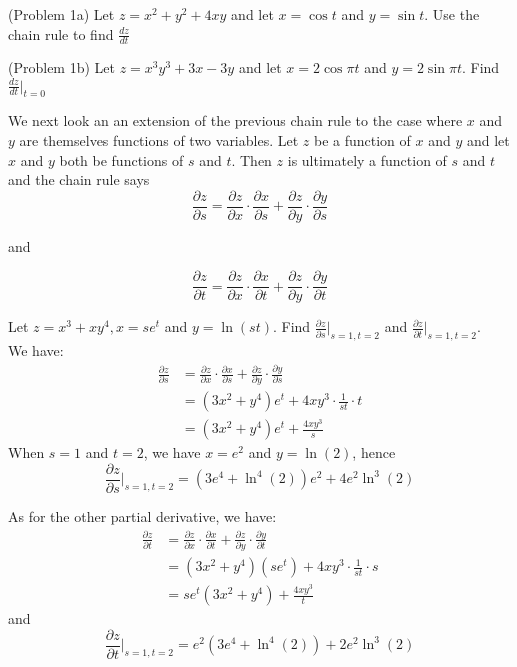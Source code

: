 \documentclass[handout]{ximera}
\begin{document}
\begin{problem}(Problem 1a)
Let $z = x^2 + y^2 + 4xy$ and let $x = \cos t$ and $y = \sin t$. Use the chain rule to find $\frac{dz}{dt}$
\end{problem}


\begin{problem}(Problem 1b)
Let $z = x^3 y^3 + 3x - 3y$ and let $x = 2\cos \pi t$ and $y = 2\sin \pi t$. Find $\frac{dz}{dt}\bigg|_{t = 0}$
\end{problem}





We next look an an extension of the previous chain rule to the case  where $x$ and $y$ are themselves functions of two variables.
Let $z$ be a function of $x$ and $y$ and let $x$ and $y$ both be functions of $s$ and $t$.  Then $z$ is ultimately a function of $s$ and $t$ and the chain rule says
\[
\frac{\partial z}{\partial s} = \frac{\partial z}{\partial x} \cdot \frac{\partial x}{\partial s} + \frac{\partial z}{\partial y} \cdot \frac{\partial y}{\partial s}
\]
\begin{center} 
and 
\end{center}
\[
\frac{\partial z}{\partial t} = \frac{\partial z}{\partial x} \cdot \frac{\partial x}{\partial t} + \frac{\partial z}{\partial y} \cdot \frac{\partial y}{\partial t} 
\]

\begin{example}[Example 2]
Let $z = x^3 + xy^4, x = se^t$ and $y = \ln(st)$. Find $\frac{\partial z}{\partial s}\bigg|_{s = 1, t = 2}$ and $\frac{\partial z}{\partial t}\bigg|_{s = 1, t = 2}$.\\



We have:
\begin{align*}
\frac{\partial z}{\partial s} &= \frac{\partial z}{\partial x} \cdot \frac{\partial x}{\partial s} + \frac{\partial z}{\partial y} \cdot \frac{\partial y}{\partial s}\\
                              &= (3x^2 + y^4)e^t + 4xy^3\cdot\frac{1}{st} \cdot t\\
                              &= (3x^2 + y^4)e^t + \frac{4xy^3}{s}
\end{align*}
When $s = 1$ and $t = 2$, we have $x = e^2$ and $y = \ln(2)$, hence
\[
\frac{\partial z}{\partial s}\bigg|_{s = 1, t = 2} = (3e^4 + \ln^4(2))e^2 + 4e^2 \ln^3(2)
\]

As for the other partial derivative, we have:
\begin{align*}
\frac{\partial z}{\partial t} &= \frac{\partial z}{\partial x} \cdot \frac{\partial x}{\partial t} + \frac{\partial z}{\partial y} \cdot \frac{\partial y}{\partial t}\\
                              &= (3x^2 + y^4)(se^t) + 4xy^3\cdot\frac{1}{st} \cdot s\\
                              &= se^t(3x^2 + y^4) + \frac{4xy^3}{t}
\end{align*}
and
\[
\frac{\partial z}{\partial t}\bigg|_{s = 1, t = 2} = e^2(3e^4 + \ln^4(2)) + 2e^2 \ln^3(2)
\]

\end{example}
\end{document}
